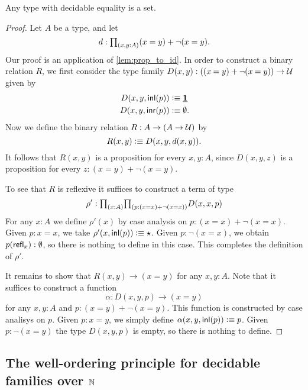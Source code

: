\begin{thm}[Hedberg]
  Any type with decidable equality is a set.
\end{thm}

\begin{proof}
  Let $A$ be a type, and let
  \begin{equation*}
    d:\prd{x,y:A}(x=y)+\neg(x=y).
  \end{equation*}
  Our proof is an application of \cref{lem:prop_to_id}. In order to construct a binary relation $R$, we first consider the type family $D(x,y):((\id{x}{y})+\neg(\id{x}{y}))\to\UU$ given by
  \begin{align*}
    D(x,y,{\mathsf{inl}}(p)) & \vcentcolon\equiv \underline{\mathbf{1}} \\
    D(x,y,{\mathsf{inr}}(p)) & \vcentcolon\equiv \emptyset.
  \end{align*}
  Now we define the binary relation $R:A\to (A\to\mathcal{U})$ by
  \begin{equation*}
    R(x,y)\vcentcolon\equiv D(x,y,d(x,y)).
  \end{equation*}
  It follows that $R(x,y)$ is a proposition for every $x,y:A$, since $D(x,y,z)$ is a proposition for every $z:(x=y)+\neg(x=y)$.

  To see that $R$ is reflexive it suffices to construct a term of type
  \begin{equation*}
    \rho':\prd{x:A}{p:(x=x)+\neg(x=x)}D(x,x,p)
  \end{equation*}
  For any $x:A$ we define $\rho'(x)$ by case analysis on $p:(x=x)+\neg(x=x)$. Given $p:x=x$, we take $\rho'(x,{\mathsf{inl}}(p))\vcentcolon\equiv\star$. Given $p:\neg(x=x)$, we obtain $p(\mathsf{refl}_{x}):\emptyset$, so there is nothing to define in this case. This completes the definition of $\rho'$.
  
  It remains to show that $R(x,y)\to (x=y)$ for any $x,y:A$. Note that it suffices to construct a function
  \begin{equation*}
    \alpha:D(x,y,p)\to (x=y)
  \end{equation*}
  for any $x,y:A$ and $p:(x=y)+\neg(x=y)$. This function is constructed by case analisys on $p$. Given $p:x=y$, we simply define $\alpha(x,y,{\mathsf{inl}}(p))\vcentcolon\equiv p$. Given $p:\neg(x=y)$ the type $D(x,y,p)$ is empty, so there is nothing to define.
\end{proof}

\subsection{The well-ordering principle for decidable families over \texorpdfstring{${\mathbb{N}}$}{ℕ}}

